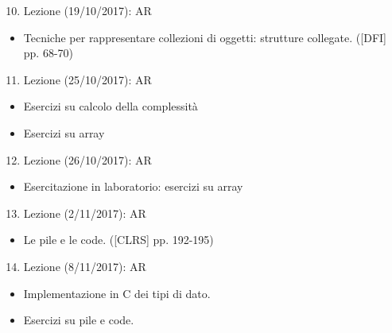 \documentclass{article}
\providecommand{\tightlist}{%
  \setlength{\itemsep}{0pt}\setlength{\parskip}{0pt}}
\begin{document}
\begin{enumerate}
\setcounter{enumi}{9}
\tightlist
\item
  {Lezione (19/10/2017): AR}
\end{enumerate}

\begin{itemize}
\tightlist
\item
  {Tecniche per rappresentare collezioni di oggetti: strutture
  collegate. ({[}DFI{]} pp. 68-70)}
\end{itemize}

\begin{enumerate}
\setcounter{enumi}{10}
\tightlist
\item
  {Lezione (25/10/2017): AR}
\end{enumerate}

\begin{itemize}
\tightlist
\item
  {Esercizi su calcolo della complessità}
\item
  {Esercizi su array}
\end{itemize}

\begin{enumerate}
\setcounter{enumi}{11}
\tightlist
\item
  {Lezione (26/10/2017): AR}
\end{enumerate}

\begin{itemize}
\tightlist
\item
  {Esercitazione in laboratorio: esercizi su array}
\end{itemize}

\begin{enumerate}
\setcounter{enumi}{12}
\tightlist
\item
  {Lezione (2/11/2017): AR}
\end{enumerate}

\begin{itemize}
\tightlist
\item
  {Le pile e le code. ({[}CLRS{]} pp. 192-195)}
\end{itemize}

\begin{enumerate}
\setcounter{enumi}{13}
\tightlist
\item
  {Lezione (8/11/2017): AR}
\end{enumerate}

\begin{itemize}
\tightlist
\item
  {Implementazione in C dei tipi di dato.}
\item
  {Esercizi su pile e code.}
\end{itemize}
\end{document}
